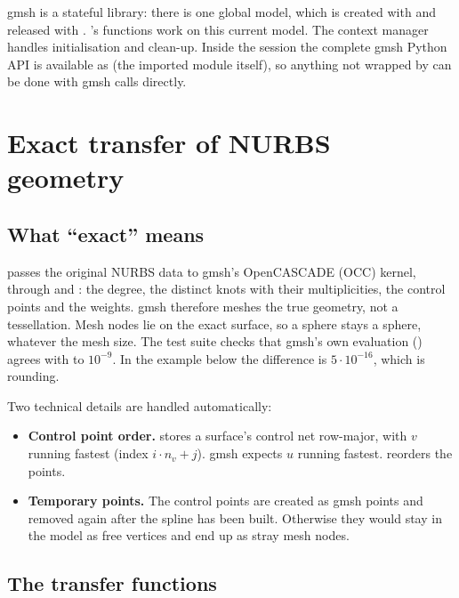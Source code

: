 gmsh is a stateful library: there is one global model, which is created with
 and released with . \NF{}'s functions work on
this current model. The context manager  handles initialisation and
clean-up. Inside the session the complete gmsh Python API is available as  (the
imported  module itself), so anything not wrapped by \NF{} can be done with gmsh
calls directly.

\section{Exact transfer of NURBS geometry}\label{sec:mesh-transfer}

\subsection{What ``exact'' means}

\NF{} passes the original NURBS data to gmsh's OpenCASCADE (OCC) kernel, through
 and : the degree, the distinct knots with
their multiplicities, the control points and the weights. gmsh therefore meshes the true
geometry, not a tessellation. Mesh nodes lie on the exact surface, so a sphere stays a sphere,
whatever the mesh size. The test suite checks that gmsh's own evaluation
() agrees with \NF{} to $10^{-9}$. In the example below the
difference is $5\cdot10^{-16}$, which is rounding.

Two technical details are handled automatically:
\begin{itemize}
  \item \textbf{Control point order.} \NF{} stores a surface's control net row-major, with
    $v$ running fastest (index $i\cdot n_v+j$). gmsh expects $u$ running fastest.
     reorders the points.
  \item \textbf{Temporary points.} The control points are created as gmsh points and removed
    again after the spline has been built. Otherwise they would stay in the model as free
    vertices and end up as stray mesh nodes.
\end{itemize}

\subsection{The transfer functions}

